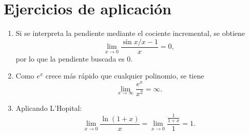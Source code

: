 \documentclass[12pt,a4paper]{article}
\begin{document}
\section{Ejercicios de aplicación}
\begin{enumerate}
    \item Si se interpreta la pendiente mediante el cociente incremental, se obtiene
    \[
    \lim_{x\to 0} \frac{\sin x / x - 1}{x} = 0,
    \]
    por lo que la pendiente buscada es $0$.

    \item Como $e^x$ crece más rápido que cualquier polinomio, se tiene
    \[
    \lim_{x\to\infty} \frac{e^x}{x^2} = \infty.
    \]

    \item Aplicando L'Hopital:
    \[
    \lim_{x\to 0} \frac{\ln(1+x)}{x}
    = \lim_{x\to 0} \frac{\frac{1}{1+x}}{1} = 1.
    \]
\end{enumerate}
\end{document}

